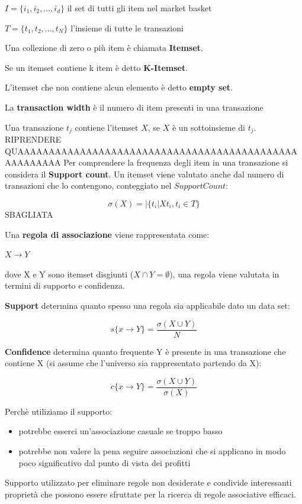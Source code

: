 $I = \{i_1, i_2,...,i_d\}$ il set di tutti gli item nel market basket

$T = \{t_1,t_2,...,t_N\}$ l'insieme di tutte le transazioni

\begin{defn}
	Una collezione di zero o più item è chiamata \textbf{Itemset}.
\end{defn} 
\begin{defn}
	Se un itemset contiene k item \`e detto \textbf{K-Itemset}.
\end{defn}
\begin{defn}
	L'itemset che non contiene alcun elemento è detto \textbf{empty set}.
\end{defn}
\begin{defn}
	La \textbf{transaction width} è il numero di item presenti in una transazione
\end{defn}
	 
Una transazione $t_j$ contiene l'itemset $X$, se $X$ è un sottoinsieme di $t_j$.
RIPRENDERE QUAAAAAAAAAAAAAAAAAAAAAAAAAAAAAAAAAAAAAAAAAAAAAAAAAAAAAA
Per comprendere la frequenza degli item in una transazione si considera il \textbf{Support count}. Un itemset viene valutato anche dal numero di transazioni che lo contengono, conteggiato nel $Support Count$:

\[ \sigma(X) = |\{t_i | X  t_i, t_i \in T\} \] SBAGLIATA

Una \textbf{regola di associazione} viene rappresentata come:

$X \rightarrow Y$

dove X e Y sono itemset disgiunti ($X \cap Y = \emptyset$), una regola viene valutata in termini di supporto e confidenza.

\textbf{Support} determina quanto spesso una regola sia applicabile dato un data set:

\[s\{x \rightarrow Y\} = \frac{\sigma(X \cup Y)}{N}\]

\textbf{Confidence} determina quanto frequente Y \`e presente in una transazione che contiene X (si assume che l'universo sia rappresentato partendo da X):

\[c\{x \rightarrow Y\} = \frac{\sigma(X \cup Y)}{\sigma(X)}\]

Perch\`e utiliziamo il supporto:
\begin{itemize}
	\item potrebbe esserci un'associazione casuale se troppo basso
	\item potrebbe non valere la pena seguire associazioni che si applicano in modo poco significativo dal punto di vista dei profitti 
\end{itemize}
Supporto utilizzato per eliminare regole non desiderate e condivide interessanti propriet\`a che possono essere sfruttate per la ricerca di regole associative efficaci.

